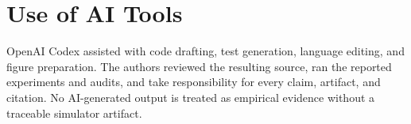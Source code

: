 \documentclass[sigplan,review,anonymous]{acmart}
\begin{document}
\maketitle










\section*{Use of AI Tools}
OpenAI Codex assisted with code drafting, test generation, language editing,
and figure preparation.  The authors reviewed the resulting source, ran the
reported experiments and audits, and take responsibility for every claim,
artifact, and citation.  No AI-generated output is treated as empirical
evidence without a traceable simulator artifact.

\clearpage


\end{document}
